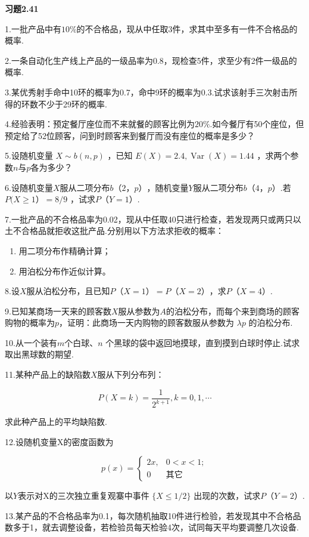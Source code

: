 \begin{center}
	\textbf{习题2.41}
\end{center}

1.一批产品中有$ 10\% $的不合格品，现从中任取3件，求其中至多有一件不合格品的概率.

2.一条自动化生产线上产品的一级品率为0.8，现检查5件，求至少有2件一级品的概率.

3.某优秀射手命中10环的概率为0.7，命中9环的概率为0.3.试求该射手三次射击所得的环数不少于29环的概率.

4.经验表明：预定餐厅座位而不来就餐的顾客比例为$ 20\% $.如今餐厅有50个座位，但预定给了52位顾客，问到时顾客来到餐厅而没有座位的概率是多少？

5.设随机变量 $X \sim b(n, p)$ ，已知 $E(X)=2.4, \operatorname{Var}(X)=1.44$ ，求两个参数$ n $与$ p $各为多少？

6.设随机变量$ X $服从二项分布$ b（2，p） $，随机变量$ Y $服从二项分布$ b（4，p） $.若 $P(X \geqslant 1）=8/9$ ，试求$ P（Y=1） $.

7.一批产品的不合格品率为0.02，现从中任取40只进行检查，若发现两只或两只以土不合格品就拒收这批产品.分别用以下方法求拒收的概率：

\begin{enumerate}
	\item 用二项分布作精确计算；
	\item 用泊松分布作近似计算。
\end{enumerate}

8.设$ X $服从泊松分布，且已知$ P（X=1）=P（X=2） $，求$ P（X=4） $.

9.已知某商场一天来的顾客数$ X $服从参数为$ A $的泊松分布，而每个来到商场的顾客购物的概率为$ p $，证明：此商场一天内购物的顾客数服从参数为 $\lambda p$ 的泊松分布.

10.从一个装有$ m $个白球、$ n $ 个黑球的袋中返回地摸球，直到摸到白球时停止.试求取出黑球数的期望.

11.某种产品上的缺陷数$ X $服从下列分布列：

\[
P(X=k)=\frac{1}{2^{k+1}}, k=0,1, \cdots
\]

求此种产品上的平均缺陷数.

12.设随机变量X的密度函数为

\[
p(x)=\left\{
\begin{array}{ll}
{2 x,} & {0<x<1 ;} \\ 
{0}    & {\text{其它}}
\end{array}
\right.
\]

以$ Y $表示对X的三次独立重复观寨中事件 $ \{X \leqslant 1 / 2\} $ 出现的次数，试求$ P（Y=2） $.

13.某产品的不合格品率为0.1，每次随机抽取10件进行检验，若发现其中不合格品数多于1，就去调整设备，若检验员每天检验4次，试同每天平均要调整几次设备.